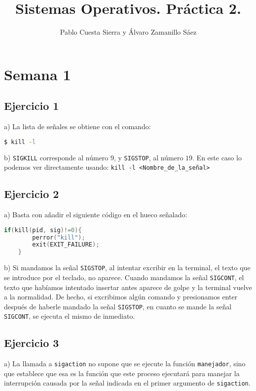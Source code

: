 \documentclass{article}
\title{Sistemas Operativos. Práctica 2.}
\author{Pablo Cuesta Sierra y Álvaro Zamanillo Sáez}
\begin{document}
\maketitle


\section*{Semana 1}

\subsection*{Ejercicio 1}
a) La lista de señales se obtiene con el comando: 

\begin{lstlisting}[language=bash]
$ kill -l
\end{lstlisting}

b) \texttt{SIGKILL} corresponde al número $9$, y \texttt{SIGSTOP}, al número $19$. En este caso lo podemos ver directamente usando: \texttt{kill -l <Nombre\_de\_la\_señal>}

\subsection*{Ejercicio 2}

a) Basta con añadir el siguiente código en el hueco señalado: 
\begin{lstlisting}[language=C]
    if(kill(pid, sig)!=0){
        perror("kill");
        exit(EXIT_FAILURE);
    }
\end{lstlisting}

b) Si mandamos la señal \texttt{SIGSTOP}, al intentar excribir en la terminal, el texto que se introduce por el teclado, no aparece. Cuando mandamos la señal \texttt{SIGCONT}, el texto que habíamos intentado insertar antes aparece de golpe y la terminal vuelve a la normalidad.
De hecho, si excribimos algún comando y presionamos enter después de haberle mandado la señal \texttt{SIGSTOP}, en cuanto se mande la señal \texttt{SIGCONT}, se ejecuta el mismo de inmediato.

\subsection*{Ejercicio 3}
a) La llamada a \texttt{sigaction} no supone que se ejecute la función \texttt{manejador}, sino que establece que esa es la función que este proceso ejecutará para manejar la interrupción causada por la señal indicada en el primer argumento de \texttt{sigaction}.
\end{document}
